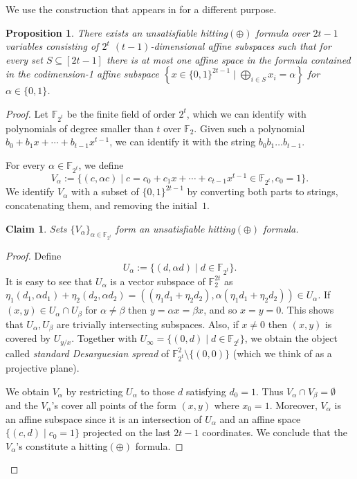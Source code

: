 \documentclass[11pt]{article}
\numberwithin{equation}{section}
\newtheorem{proposition}[theorem]{Proposition}
\newtheorem{claim}[theorem]{Claim}
\begin{document}
We use the construction that appears in \cite[Section 5.1]{avsp} for a different purpose.
\begin{proposition}
    There exists an unsatisfiable hitting$(\oplus)$ formula over $2t-1$ variables consisting of $2^t$ $(t-1)$-dimensional affine subspaces such that for every set $S \subseteq [2t-1]$ there is at most one affine space in the formula contained in the codimension-1 affine subspace $\left\{x \in\{0,1\}^{2t-1} \mid \bigoplus_{i \in S} x_i = \alpha\right\}$ for $\alpha \in \{0,1\}$.
\end{proposition}
\begin{proof}
   Let $\mathbb{F}_{2^t}$ be the finite field of order $2^t$, which we can identify with polynomials of degree smaller than $t$ over $\mathbb{F}_2$. Given such a polynomial $b_0 + b_1 x + \dotsb + b_{t-1} x^{t-1}$, we can identify it with the string $b_0 b_1 \ldots b_{t-1}$.

For every $\alpha \in \mathbb{F}_{2^t}$, we define
\[
 V_\alpha := \{ (c, \alpha c) \mid c = c_0 + c_1 x + \dotsb + c_{t-1} x^{t-1} \in \mathbb{F}_{2^t}, c_0 = 1 \}.
\]
We identify $V_\alpha$ with a subset of $\{0,1\}^{2t-1}$ by converting both parts to strings, concatenating them, and removing the initial~$1$.

\begin{claim}
Sets $\{V_\alpha\}_{\alpha \in \mathbb{F}_{2^t}}$ form an unsatisfiable hitting$(\oplus)$ formula.
\end{claim} 
\begin{proof}
Define
\[
 U_\alpha := \{ (d, \alpha d) \mid d \in \mathbb{F}_{2^t} \}.
\]
It is easy to see that $U_\alpha$ is a vector subspace of $\mathbb{F}_2^{2t}$ as $\eta_1(d_1, \alpha d_1) + \eta_2(d_2, \alpha d_2) = ((\eta_1 d_1 + \eta_2 d_2), \alpha (\eta_1 d_1 + \eta_2 d_2)) \in U_\alpha$. If $(x,y) \in U_\alpha \cap U_\beta$ for $\alpha \neq \beta$ then $y = \alpha x = \beta x$, and so $x = y = 0$. This shows that $U_\alpha,U_\beta$ are trivially intersecting subspaces. Also, if $x \neq 0$ then $(x,y)$ is covered by $U_{y/x}$. Together with $U_\infty = \{ (0,d) \mid d \in \mathbb{F}_{2^t} \}$, we obtain the object called \emph{standard Desarguesian spread} of $\mathbb{F}_{2^t}^2 \setminus \{(0,0)\}$ (which we think of as a projective plane).

We obtain $V_\alpha$ by restricting $U_\alpha$ to those $d$ satisfying $d_0 = 1$. Thus $V_\alpha \cap V_\beta = \emptyset$ and the $V_\alpha$'s cover all points of the form $(x,y)$ where $x_0 = 1$. Moreover, $V_\alpha$ is an affine subspace since it is an intersection of $U_\alpha$ and an affine space $\{(c,d) \mid c_0 = 1\}$ projected on the last $2t-1$ coordinates. We conclude that the $V_\alpha$'s constitute a hitting$(\oplus)$ formula.
\end{proof}


\end{proof}
\end{document}
